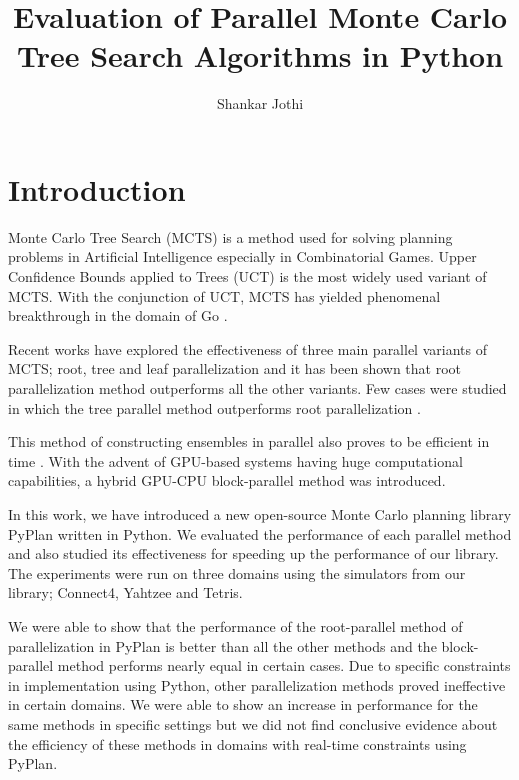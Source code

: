 \documentclass[double,12pt]{beavtex}
\title{Evaluation of Parallel Monte Carlo Tree Search Algorithms in Python}
\author{Shankar Jothi}
\begin{document}
\maketitle

\mainmatter

\chapter{Introduction}
Monte Carlo Tree Search (MCTS) is a method used for solving planning problems in Artificial Intelligence especially in Combinatorial Games\cite{chaslot2008monte}. Upper Confidence Bounds applied to Trees (UCT) is the most widely used variant of MCTS. With the conjunction of UCT, MCTS has yielded phenomenal breakthrough in the domain of Go \cite{gelly2007combining}. 

Recent works have explored the effectiveness of three main parallel variants of MCTS; root, tree and leaf parallelization and it has been shown that root parallelization method outperforms all the other variants\cite{chaslot2008parallel}. Few cases were studied in which the tree parallel method outperforms root parallelization \cite{chaslot2008parallel}. 

This method of constructing ensembles in parallel also proves to be efficient in time \cite{fern2011ensemble}. With the advent of GPU-based systems having huge computational capabilities, a hybrid GPU-CPU block-parallel method was introduced\cite{rocki2011parallel}.

In this work, we have introduced a new open-source Monte Carlo planning library PyPlan written in Python. We evaluated the performance of each parallel method and also studied its effectiveness for speeding up the performance of our library. The experiments were run on three domains using the simulators from our library; Connect4, Yahtzee and Tetris.

We were able to show that the performance of the root-parallel method of parallelization in PyPlan is better than all the other methods and the block-parallel method performs nearly equal in certain cases. Due to specific constraints in implementation using Python, other parallelization methods proved ineffective in certain domains.  We were able to show an increase in performance for the same methods in specific settings but we did not find conclusive evidence about the efficiency of these methods in domains with real-time constraints using PyPlan.
\end{document}
